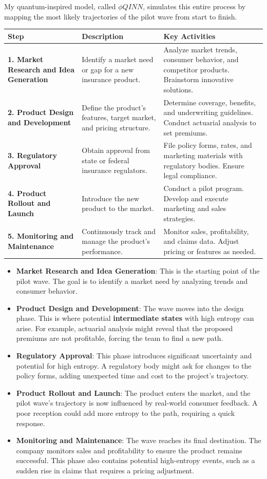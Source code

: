 \documentclass{article}
\begin{document}
My quantum-inspired model, called $\phi QINN$, simulates this entire process by mapping the most likely trajectories of the pilot wave from start to finish.
\begin{center}
\begin{tabular}{|p{4cm}|p{6cm}|p{6cm}|}
\hline
\textbf{Step} & \textbf{Description} & \textbf{Key Activities} \\
\hline
\textbf{1. Market Research and Idea Generation} & Identify a market need or gap for a new insurance product. & Analyze market trends, consumer behavior, and competitor products. Brainstorm innovative solutions. \\
\hline
\textbf{2. Product Design and Development} & Define the product's features, target market, and pricing structure. & Determine coverage, benefits, and underwriting guidelines. Conduct actuarial analysis to set premiums. \\
\hline
\textbf{3. Regulatory Approval} & Obtain approval from state or federal insurance regulators. & File policy forms, rates, and marketing materials with regulatory bodies. Ensure legal compliance. \\
\hline
\textbf{4. Product Rollout and Launch} & Introduce the new product to the market. & Conduct a pilot program. Develop and execute marketing and sales strategies. \\
\hline
\textbf{5. Monitoring and Maintenance} & Continuously track and manage the product's performance. & Monitor sales, profitability, and claims data. Adjust pricing or features as needed. \\
\hline
\end{tabular}
\end{center}
\begin{itemize}
\item \textbf{Market Research and Idea Generation}: This is the starting point of the pilot wave. The goal is to identify a market need by analyzing trends and consumer behavior.
\item \textbf{Product Design and Development}: The wave moves into the design phase. This is where potential \textbf{intermediate states} with high entropy can arise. For example, actuarial analysis might reveal that the proposed premiums are not profitable, forcing the team to find a new path.
\item \textbf{Regulatory Approval}: This phase introduces significant uncertainty and potential for high entropy. A regulatory body might ask for changes to the policy forms, adding unexpected time and cost to the project's trajectory.
\item \textbf{Product Rollout and Launch}: The product enters the market, and the pilot wave's trajectory is now influenced by real-world consumer feedback. A poor reception could add more entropy to the path, requiring a quick response.
\item \textbf{Monitoring and Maintenance}: The wave reaches its final destination. The company monitors sales and profitability to ensure the product remains successful. This phase also contains potential high-entropy events, such as a sudden rise in claims that requires a pricing adjustment.
\end{itemize}
\end{document}
